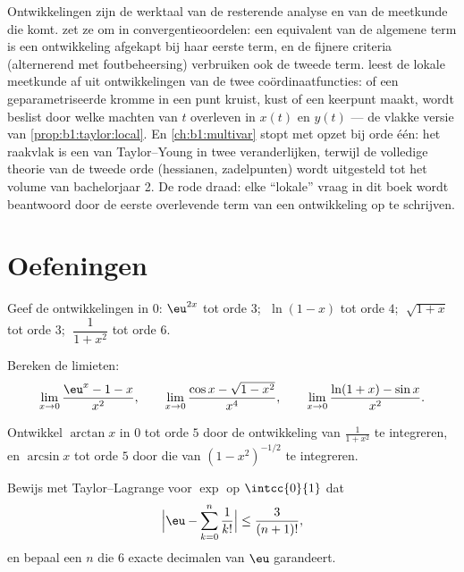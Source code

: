 \begin{remark}
Ontwikkelingen zijn de werktaal van de resterende analyse en van
de meetkunde die komt.  zet ze om in
convergentieoordelen: een equivalent van de algemene term is een
ontwikkeling afgekapt bij haar eerste term, en de fijnere
criteria (alternerend met foutbeheersing) verbruiken ook de
tweede term.  leest de lokale meetkunde af uit
ontwikkelingen van de twee coördinaatfuncties: of een
geparametriseerde kromme in een punt kruist, kust of een keerpunt
maakt, wordt beslist door welke machten van $t$ overleven in
$x(t)$ en $y(t)$ --- de vlakke versie van
\cref{prop:b1:taylor:local}. En \cref{ch:b1:multivar} stopt met
opzet bij orde één: het raakvlak is een  van
Taylor--Young in twee veranderlijken, terwijl de volledige
theorie van de tweede orde (hessianen, zadelpunten) wordt
uitgesteld tot het volume van bachelorjaar 2. De rode draad: elke
``lokale'' vraag in dit boek wordt beantwoord door de eerste
overlevende term van een ontwikkeling op te schrijven.
\end{remark}

\section{Oefeningen}

\begin{exercise}[$\star$]\label{exo:b1:taylor:1}
Geef de ontwikkelingen in $0$: $\eu^{2x}$ tot orde $3$;
$\;\ln(1 - x)$ tot orde $4$; $\;\sqrt{1 + x}$ tot orde $3$;
$\;\dfrac{1}{1 + x^2}$ tot orde $6$.
\end{exercise}

\begin{exercise}[$\star$]\label{exo:b1:taylor:2}
Bereken de limieten:
\[
\lim_{x\to 0} \frac{\eu^x - 1 - x}{x^2},
\qquad
\lim_{x\to 0} \frac{\cos x - \sqrt{1 - x^2}}{x^4},
\qquad
\lim_{x\to 0} \frac{\ln(1+x) - \sin x}{x^2}.
\]
\end{exercise}

\begin{exercise}[$\star$]\label{exo:b1:taylor:3}
Ontwikkel $\arctan x$ in $0$ tot orde $5$ door de ontwikkeling van
$\frac{1}{1 + x^2}$ te integreren, en $\arcsin x$ tot orde $5$ door
die van $(1 - x^2)^{-1/2}$ te integreren.
\end{exercise}

\begin{exercise}[$\star$]\label{exo:b1:taylor:4}
Bewijs met Taylor--Lagrange voor $\exp$ op $\intcc{0}{1}$ dat
\[
\Bigl| \eu - \sum_{k=0}^{n} \frac{1}{k!} \Bigr| \leq
\frac{3}{(n+1)!},
\]
en bepaal een $n$ die $6$ exacte decimalen van $\eu$ garandeert.
\end{exercise}

